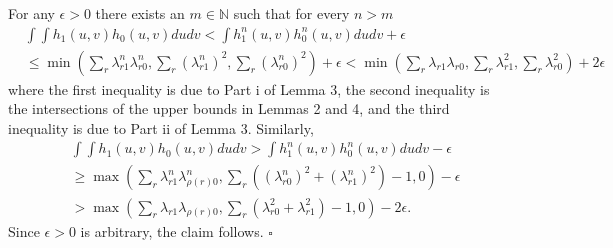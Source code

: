 \documentclass[12pt]{article}
\theoremstyle{definition}
\begin{document}
For any $\epsilon > 0$ there exists an $m \in \mathbb{N}$ such that for every $n > m$
\begin{align*}
 &\int\int h_{1}(u,v)h_{0}(u,v)dudv
 < \int h_{1}^{n}(u,v)h_{0}^{n}(u,v)dudv + \epsilon \\
& \leq  \min\left(\sum_{r}\lambda^{n}_{r1}\lambda^{n}_{r0},\sum_{r}(\lambda^{n}_{r1})^{2},\sum_{r}(\lambda^{n}_{r0})^{2}\right) + \epsilon  
< \min\left(\sum_{r}\lambda_{r1}\lambda_{r0},\sum_{r}\lambda^{2}_{r1},\sum_{r}\lambda^{2}_{r0}\right) + 2\epsilon
\end{align*}
where the first inequality is due to Part i of Lemma 3, the second inequality is the intersections of the upper bounds in Lemmas 2 and 4, and the third inequality is due to Part ii of Lemma 3. Similarly, 
\begin{align*}
 &\int\int h_{1}(u,v)h_{0}(u,v)dudv 
 > \int h_{1}^{n}(u,v)h_{0}^{n}(u,v)dudv - \epsilon \\
& \geq \max\left(\sum_{r}\lambda^{n}_{r1}\lambda^{n}_{\rho(r)0},\sum_{r }\left((\lambda_{r0}^{n})^{2}+(\lambda_{r1}^{n})^{2}\right) - 1,0\right) - \epsilon \\
 &> \max\left(\sum_{r}\lambda_{r1}\lambda_{\rho(r)0},\sum_{r}\left(\lambda_{r0}^{2}+\lambda_{r1}^{2}\right) - 1,0\right) - 2\epsilon.
\end{align*}
Since $\epsilon > 0$ is arbitrary, the claim follows. $\square$
\end{document}
